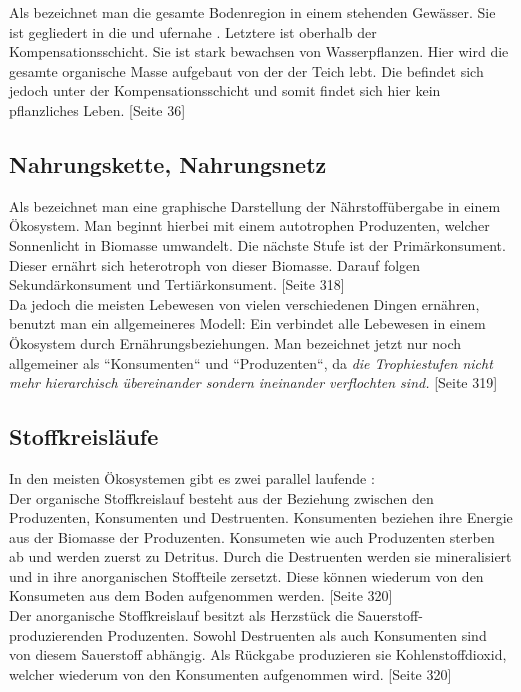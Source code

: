 \documentclass{article}
\begin{document}
    
        Als  bezeichnet man die gesamte Bodenregion in einem stehenden Gewässer. \cite{Was} Sie ist gegliedert in die  und ufernahe . Letztere ist oberhalb der Kompensationsschicht. Sie ist stark bewachsen von Wasserpflanzen. Hier wird die gesamte organische Masse aufgebaut von der der Teich lebt. Die  befindet sich jedoch unter der Kompensationsschicht und somit findet sich hier kein pflanzliches Leben. \cite{Was} [Seite 36]
    
    \subsection{Nahrungskette, Nahrungsnetz}
    
        Als  bezeichnet man eine graphische Darstellung der Nährstoffübergabe in einem Ökosystem.  Man beginnt hierbei mit einem autotrophen Produzenten, welcher Sonnenlicht in Biomasse umwandelt. Die nächste Stufe ist der Primärkonsument. Dieser ernährt sich heterotroph von dieser Biomasse. Darauf folgen Sekundärkonsument und Tertiärkonsument. \cite{Biobuch} [Seite 318] \\
        \vspace{5mm}
        Da jedoch die meisten Lebewesen von vielen verschiedenen Dingen ernähren, benutzt man ein allgemeineres Modell: Ein  verbindet alle Lebewesen in einem Ökosystem durch Ernährungsbeziehungen. Man bezeichnet jetzt nur noch allgemeiner als ``Konsumenten`` und ``Produzenten``, da \textit{die Trophiestufen nicht mehr hierarchisch übereinander sondern ineinander verflochten sind.} \cite{Biobuch} [Seite 319]
    
    \subsection{Stoffkreisläufe}
    
        In den meisten Ökosystemen gibt es zwei parallel laufende : \\
        \vspace{5mm}
        Der organische Stoffkreislauf besteht aus der Beziehung zwischen den Produzenten, Konsumenten und Destruenten. Konsumenten beziehen ihre Energie aus der Biomasse der Produzenten. Konsumeten wie auch Produzenten sterben ab und werden zuerst zu Detritus. Durch die Destruenten werden sie mineralisiert und in ihre anorganischen Stoffteile zersetzt. Diese können wiederum von den Konsumeten aus dem Boden aufgenommen werden. \cite{Biobuch} [Seite 320] \\
        \vspace{5mm}
        Der anorganische Stoffkreislauf besitzt als Herzstück die Sauerstoff-produzierenden Produzenten. Sowohl Destruenten als auch Konsumenten sind von diesem Sauerstoff abhängig. Als Rückgabe produzieren sie Kohlenstoffdioxid, welcher wiederum von den Konsumenten aufgenommen wird. \cite{Biobuch} [Seite 320] \\
\end{document}
